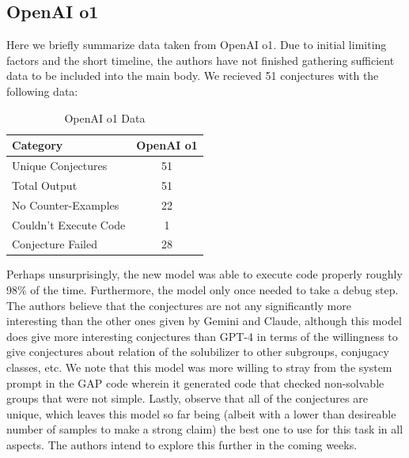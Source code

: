 \documentclass{article}
\begin{document}
\subsection{OpenAI o1}\label{openaio1}
Here we briefly summarize data taken from OpenAI o1\cite{openai2024o1}. Due to initial limiting factors and the short timeline, the authors have not finished gathering sufficient data to be included into the main body. We recieved 51 conjectures with the following data:
\begin{table}[ht] 
\centering 
\caption{OpenAI o1 Data} 
\begin{tabular}{lc} 
\toprule \textbf{Category} & \textbf{OpenAI o1}  \\ \midrule Unique Conjectures & 51   \\ 
Total Output & 51  \\
\midrule No Counter-Examples & 22  \\
Couldn't Execute Code & 1 \\
Conjecture Failed & 28 \\
\bottomrule 
\end{tabular} 
\label{tab:o1 data} 
\end{table}

Perhaps unsurprisingly, the new model was able to execute code properly roughly 98\% of the time. Furthermore, the model only once needed to take a debug step. The authors believe that the conjectures are not any significantly more interesting than the other ones given by Gemini and Claude, although this model does give more interesting conjectures than GPT-4 in terms of the willingness to give conjectures about relation of the solubilizer to other subgroups, conjugacy classes, etc. We note that this model was more willing to stray from the system prompt in the GAP code wherein it generated code that checked non-solvable groups that were not simple. Lastly, observe that all of the conjectures are unique, which leaves this model so far being (albeit with a lower than desireable number of samples to make a strong claim) the best one to use for this task in all aspects. The authors intend to explore this further in the coming weeks. 
\end{document}
